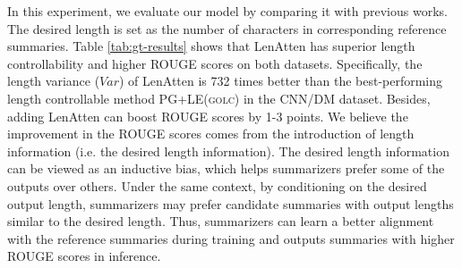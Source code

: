 \documentclass[11pt,a4paper]{article}
\begin{document}
\begin{table}[t]
\caption{Results on CNN/DM and AEG dataset. If not specified in the parentheses, the training objective function is MLE by default. Results retrieved from: * \citet{see-etal-2017-get}; $\dagger$ \citet{xu-etal-2020-self}; $\ddagger$ \citet{makino-etal-2019-global}.}
\label{tab:gt-results}
\end{table}
\label{sec:experiment-gtsummarylength}
In this experiment, we evaluate our model by comparing it with previous works. The desired length is set as the number of characters in corresponding reference summaries. Table \ref{tab:gt-results} shows that LenAtten has superior length controllability and higher ROUGE scores on both datasets. Specifically, the length variance ($Var$) of LenAtten is 732 times better than the best-performing length controllable method \textsc{PG+LE(golc)} in the CNN/DM dataset. Besides, adding LenAtten can boost ROUGE scores by 1-3 points. We believe the improvement in the ROUGE scores comes from the introduction of length information (i.e. the desired length information). The desired length information can be viewed as an inductive bias, which helps summarizers prefer some of the outputs over others. Under the same context, by conditioning on the desired output length, summarizers may prefer candidate summaries with output lengths similar to the desired length. Thus, summarizers can learn a better alignment with the reference summaries during training and outputs summaries with higher ROUGE scores in inference.
\end{document}
